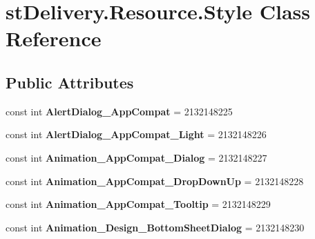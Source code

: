 \hypertarget{classst_delivery_1_1_resource_1_1_style}{}\section{st\+Delivery.\+Resource.\+Style Class Reference}
\label{classst_delivery_1_1_resource_1_1_style}
\subsection*{Public Attributes}
\begin{DoxyCompactItemize}
\item 
\mbox{\label{classst_delivery_1_1_resource_1_1_style_af876f3d268ea9acebd0201efe3bd0265}} 
const int {\bfseries Alert\+Dialog\+\_\+\+App\+Compat} = 2132148225
\item 
\mbox{\label{classst_delivery_1_1_resource_1_1_style_aa17617cc16aced970d93d2091a3915ad}} 
const int {\bfseries Alert\+Dialog\+\_\+\+App\+Compat\+\_\+\+Light} = 2132148226
\item 
\mbox{\label{classst_delivery_1_1_resource_1_1_style_a880ba6edca1a2c07bdc4d47e4b816d10}} 
const int {\bfseries Animation\+\_\+\+App\+Compat\+\_\+\+Dialog} = 2132148227
\item 
\mbox{\label{classst_delivery_1_1_resource_1_1_style_ad7d65c72e92b5c0161595482a56454bc}} 
const int {\bfseries Animation\+\_\+\+App\+Compat\+\_\+\+Drop\+Down\+Up} = 2132148228
\item 
\mbox{\label{classst_delivery_1_1_resource_1_1_style_a2d18ea336faed60ed06bddfb6101943b}} 
const int {\bfseries Animation\+\_\+\+App\+Compat\+\_\+\+Tooltip} = 2132148229
\item 
\mbox{\label{classst_delivery_1_1_resource_1_1_style_a49dad77941b9677ee4f03557a93d205d}} 
const int {\bfseries Animation\+\_\+\+Design\+\_\+\+Bottom\+Sheet\+Dialog} = 2132148230
\item 
\mbox{\label{classst_delivery_1_1_resource_1_1_style_a3bbbfd56f95cb6a6c34adb24a2636e81}} 

\end{DoxyCompactItemize}
